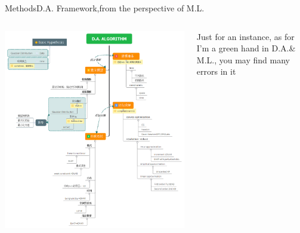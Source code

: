 \documentclass{beamer}
\begin{document}
\begin{frame}{Methods}{\quad \quad \quad D.A. Framework,from the perspective of M.L.}
\begin{columns}


\includegraphics[scale=.18]{fig/daalg.png}


Just for an instance, as for I\rq{}m a green hand in D.A.\& M.L., you may find many errors in it

\end{columns}


\end{frame}


\end{document}

